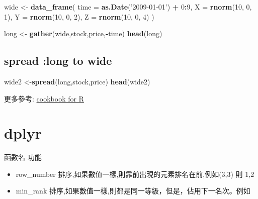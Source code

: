 \documentclass[]{book}
\newenvironment{Shaded}{\begin{snugshade}}{\end{snugshade}}
\newcommand{\KeywordTok}[1]{\textcolor[rgb]{0.13,0.29,0.53}{\textbf{#1}}}
\newcommand{\DataTypeTok}[1]{\textcolor[rgb]{0.13,0.29,0.53}{#1}}
\newcommand{\DecValTok}[1]{\textcolor[rgb]{0.00,0.00,0.81}{#1}}
\newcommand{\StringTok}[1]{\textcolor[rgb]{0.31,0.60,0.02}{#1}}
\newcommand{\OperatorTok}[1]{\textcolor[rgb]{0.81,0.36,0.00}{\textbf{#1}}}
\newcommand{\NormalTok}[1]{#1}
\theoremstyle{definition}
\theoremstyle{definition}
\theoremstyle{definition}
\theoremstyle{remark}
\begin{document}
\begin{Shaded}
\begin{Highlighting}[]
\NormalTok{wide <-}\StringTok{ }\KeywordTok{data_frame}\NormalTok{(}
  \DataTypeTok{time =} \KeywordTok{as.Date}\NormalTok{(}\StringTok{'2009-01-01'}\NormalTok{) }\OperatorTok{+}\StringTok{ }\DecValTok{0}\OperatorTok{:}\DecValTok{9}\NormalTok{,}
  \DataTypeTok{X =} \KeywordTok{rnorm}\NormalTok{(}\DecValTok{10}\NormalTok{, }\DecValTok{0}\NormalTok{, }\DecValTok{1}\NormalTok{),}
  \DataTypeTok{Y =} \KeywordTok{rnorm}\NormalTok{(}\DecValTok{10}\NormalTok{, }\DecValTok{0}\NormalTok{, }\DecValTok{2}\NormalTok{),}
  \DataTypeTok{Z =} \KeywordTok{rnorm}\NormalTok{(}\DecValTok{10}\NormalTok{, }\DecValTok{0}\NormalTok{, }\DecValTok{4}\NormalTok{)}
\NormalTok{)}

\NormalTok{long <-}\StringTok{ }\KeywordTok{gather}\NormalTok{(wide,stock,price,}\OperatorTok{-}\NormalTok{time)}
\KeywordTok{head}\NormalTok{(long)}
\end{Highlighting}
\end{Shaded}

\subsection{spread :long to wide}\label{spread-long-to-wide}

\begin{Shaded}
\begin{Highlighting}[]
\NormalTok{wide2 <-}\KeywordTok{spread}\NormalTok{(long,stock,price)}
\KeywordTok{head}\NormalTok{(wide2)}
\end{Highlighting}
\end{Shaded}

更多參考:
\href{http://www.cookbook-r.com/Manipulating_data/Converting_data_between_wide_and_long_format/}{cookbook
for R}

\section{dplyr}\label{dplyr}

函數名 功能

\begin{itemize}
\item
  row\_number 排序,如果數值一樣,則靠前出現的元素排名在前,例如(3,3) 則
  1,2
\item
  min\_rank 排序,如果數值一樣,則都是同一等級，但是，佔用下一名次。例如
\end{itemize}
\end{document}

